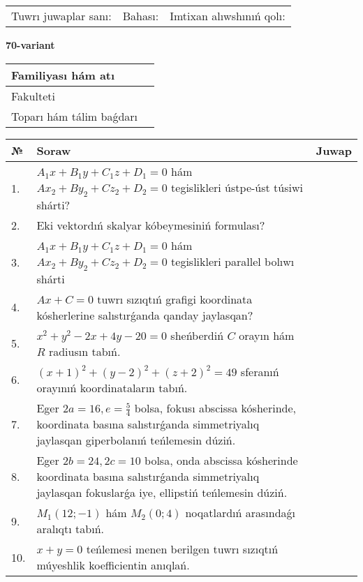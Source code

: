\documentclass{article}
\begin{document}
\vspace{1cm}

\begin{tabular}{lll}
Tuwrı juwaplar sanı: \underline{\hspace{1.5cm}} & 
Bahası: \underline{\hspace{1.5cm}} & 
Imtixan alıwshınıń qolı: \underline{\hspace{2cm}} \\
\end{tabular}

\egroup

\newpage


\textbf{70-variant}\\

\bgroup
\def\arraystretch{1.6} %

\begin{tabular}{|m{5.7cm}|m{9.5cm}|}
\hline
Familiyası hám atı & \\
\hline
Fakulteti  & \\
\hline
Toparı hám tálim baǵdarı  & \\
\hline
\end{tabular}

\vspace{1cm}

\begin{tabular}{|m{0.7cm}|m{10cm}|m{4cm}|}
\hline
№ & Soraw & Juwap \\
\hline
1. & $A_1x+B_1y+C_1z+D_1=0$ hám $Ax_2+By_2+Cz_2+D_2=0$ tegislikleri ústpe-úst túsiwi shárti? &  \\
\hline
2. & Eki vektordıń skalyar kóbeymesiniń formulası? &  \\
\hline
3. & $A_1x+B_1y+C_1z+D_1=0$ hám $Ax_2+By_2+Cz_2+D_2=0$ tegislikleri parallel bolıwı shárti &  \\
\hline
4. & $Ax+C=0$ tuwrı sızıqtıń grafigi koordinata kósherlerine salıstırǵanda qanday jaylasqan? &  \\
\hline
5. & $x^{2}+y^{2}-2x+4y-20=0$ sheńberdiń $C$ orayın hám $R$ radiusın tabıń. &  \\
\hline
6. & $(x+1)^{2}+(y-2) ^{2}+(z+2) ^{2}=49$ sferanıń orayınıń koordinataların tabıń. &  \\
\hline
7. & Eger $2a=16, e=\frac{5}{4}$ bolsa, fokusı abscissa kósherinde, koordinata basına salıstırǵanda simmetriyalıq jaylasqan giperbolanıń teńlemesin dúziń. &  \\
\hline
8. & Eger $2b=24, 2 c=10$ bolsa, onda abscissa kósherinde koordinata basına salıstırǵanda simmetriyalıq jaylasqan fokuslarǵa iye, ellipstiń teńlemesin dúziń. &  \\
\hline
9. & $M_{1} (12;-1)$ hám $M_{2} (0;4)$ noqatlardıń arasındaǵı aralıqtı tabıń. &  \\
\hline
10. & $x+y=0$ teńlemesi menen berilgen tuwrı sızıqtıń múyeshlik koefficientin anıqlań. &  \\
\hline
\end{tabular}
\end{document}
